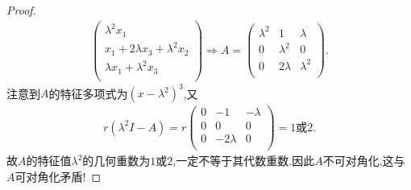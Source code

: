 \documentclass[../../main.tex]{subfiles}%
\begin{document}
\begin{proof}
\begin{align*}
\begin{pmatrix}
\lambda^2x_1\\
x_1+2\lambda x_3+\lambda^2x_2\\
\lambda x_1+\lambda^2x_3\\
\end{pmatrix}\Longrightarrow A=\begin{pmatrix}
\lambda^2&		1&		\lambda\\
0&		\lambda^2&		0\\
0&		2\lambda&		\lambda^2\\
\end{pmatrix}.
\end{align*}
注意到$A$的特征多项式为$(x-\lambda^2)^3$,又
\begin{align*}
r(\lambda^2I-A)=r\begin{pmatrix}
0&		-1&		-\lambda\\
0&		0&		0\\
0&		-2\lambda&		0\\
\end{pmatrix}=1\text{或}2.
\end{align*}
故$A$的特征值$\lambda^2$的几何重数为$1$或$2$,一定不等于其代数重数.因此$A$不可对角化,这与$A$可对角化矛盾!
\end{proof}
\end{document}
